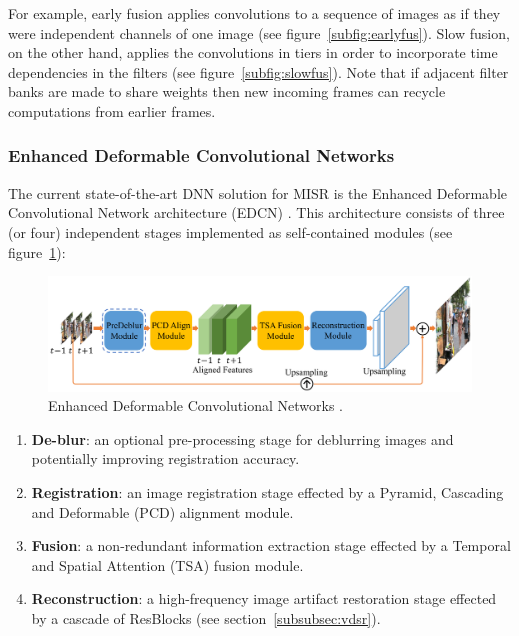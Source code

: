 %
For example, early fusion applies convolutions to a sequence of images as if they were independent channels of one image (see figure~\ref{subfig:earlyfus}).
%
Slow fusion, on the other hand, applies the convolutions in tiers in order to incorporate time dependencies in the filters (see figure~\ref{subfig:slowfus}).
%
Note that if adjacent filter banks are made to share weights then new incoming frames can recycle computations from earlier frames.




\subsubsection{Enhanced Deformable Convolutional Networks}



The current state-of-the-art DNN solution for MISR is the Enhanced Deformable Convolutional Network architecture (EDCN) \cite{wang2019edvr}.
%
This architecture consists of three (or four) independent stages implemented as self-contained modules (see figure~\ref{fig:edvr}): 
\begin{figure}[!htbp]
    \includegraphics[width=\textwidth]{figures/neural_networks/edvr.png}
    \caption[]{Enhanced Deformable Convolutional Networks \cite{wang2019edvr}.}\label{fig:edvr}
\end{figure}
\begin{mdframed}
    \begin{enumerate}
        \item \textbf{De-blur}: an optional pre-processing stage for deblurring images and potentially improving registration accuracy.
        \item \textbf{Registration}: an image registration stage effected by a Pyramid, Cascading and Deformable (PCD) alignment module.
        \item \textbf{Fusion}: a non-redundant information extraction stage effected by a Temporal and Spatial Attention (TSA) fusion module.
        \item \textbf{Reconstruction}: a high-frequency image artifact restoration stage effected by a cascade of ResBlocks (see section~\ref{subsubsec:vdsr}).
    \end{enumerate}
\end{mdframed}

